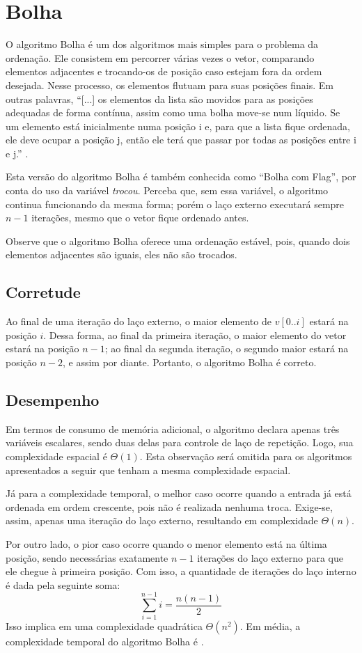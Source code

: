 \section{Bolha}
O algoritmo Bolha é um dos algoritmos mais simples para o problema da ordenação. Ele consistem em percorrer várias vezes o vetor, comparando elementos adjacentes e trocando-os de posição caso estejam fora da ordem desejada. Nesse processo, os elementos flutuam para suas posições finais. Em outras palavras, ``[...]  os elementos da lista são movidos para as posições adequadas de forma contínua, assim como uma bolha move-se num líquido. Se um elemento está inicialmente numa posição i e, para que a lista fique ordenada, ele deve ocupar a posição j, então ele terá que passar por todas as posições entre i e j.'' \cite[p.8]{viana2011pesquisa}.



Esta versão do algoritmo Bolha é também conhecida como ``Bolha com Flag'', por conta do uso da variável \textit{trocou}. Perceba que, sem essa variável, o algoritmo continua funcionando da mesma forma; porém o laço externo executará sempre $n - 1$ iterações, mesmo que o vetor fique ordenado antes.

Observe que o algoritmo Bolha oferece uma ordenação estável, pois, quando dois elementos adjacentes são iguais, eles não são trocados.

\subsection*{Corretude}
Ao final de uma iteração do laço externo, o maior elemento de $v[0..i]$ estará na posição $i$. Dessa forma, ao final da primeira iteração, o maior elemento do vetor estará na posição $n - 1$; ao final da segunda iteração, o segundo maior estará na posição $n - 2$, e assim por diante. Portanto, o algoritmo Bolha é correto.

\subsection*{Desempenho}
Em termos de consumo de memória adicional, o algoritmo declara apenas três variáveis escalares, sendo duas delas para controle de laço de repetição. Logo, sua complexidade espacial é $\Theta(1)$. Esta observação será omitida para os algoritmos apresentados a seguir que tenham a mesma complexidade espacial.

Já para a complexidade temporal, o melhor caso ocorre quando a entrada já está ordenada em ordem crescente, pois não é realizada nenhuma troca. Exige-se, assim, apenas uma iteração do laço externo, resultando em complexidade $\Theta(n)$.

Por outro lado, o pior caso ocorre quando o menor elemento está na última posição, sendo necessárias exatamente $n - 1$ iterações do laço externo para que ele chegue à primeira posição. Com isso, a quantidade de iterações do laço interno é dada pela seguinte soma:
\begin{equation}\label{eq:1}
    \sum_{i=1}^{n-1} i = \frac{n(n-1)}{2}
\end{equation}
Isso implica em uma complexidade quadrática $\Theta(n^2)$. Em média, a complexidade temporal do algoritmo Bolha é .
